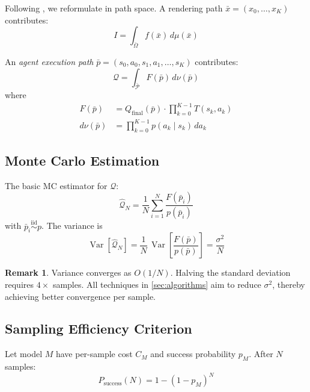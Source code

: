 \documentclass[11pt,twocolumn]{article}
\theoremstyle{definition}
\newtheorem{remark}[theorem]{Remark}
\newcommand{\Var}{\operatorname{Var}}
\newcommand{\Pspace}{\bar{\mathcal{P}}}
\begin{document}
Following \citet{veach1997robust}, we reformulate in path space.
A rendering path $\bar{x} = (x_0, \ldots, x_K)$ contributes:
\begin{equation}\label{eq:veach-path}
  I = \int_{\bar\Omega} f(\bar{x})\,d\mu(\bar{x})
\end{equation}

An \emph{agent execution path}
$\bar{p} = (s_0, a_0, s_1, a_1, \ldots, s_K)$ contributes:
\begin{equation}\label{eq:agent-path}
  \mathcal{Q} = \int_{\Pspace} F(\bar{p})\,d\nu(\bar{p})
\end{equation}
where
\begin{align}
  F(\bar{p}) &= Q_{\text{final}}(\bar{p}) \cdot \prod_{k=0}^{K-1} T(s_k, a_k) \label{eq:path-throughput} \\
  d\nu(\bar{p}) &= \prod_{k=0}^{K-1} p(a_k \mid s_k)\,da_k \label{eq:path-measure}
\end{align}

\subsection{Monte Carlo Estimation}\label{sec:mc-basics}

The basic MC estimator for $\mathcal{Q}$:
\begin{equation}\label{eq:mc-estimator}
  \hat{\mathcal{Q}}_N = \frac{1}{N}\sum_{i=1}^{N} \frac{F(\bar{p}_i)}{p(\bar{p}_i)}
\end{equation}
with $\bar{p}_i \overset{\text{iid}}{\sim} p$.
The variance is
\begin{equation}\label{eq:mc-variance}
  \Var[\hat{\mathcal{Q}}_N]
    = \frac{1}{N}\,\Var\!\left[\frac{F(\bar{p})}{p(\bar{p})}\right]
    = \frac{\sigma^2}{N}
\end{equation}

\begin{remark}
Variance converges as $O(1/N)$.
Halving the standard deviation requires $4\times$ samples.
All techniques in \cref{sec:algorithms} aim to reduce $\sigma^2$,
thereby achieving better convergence per sample.
\end{remark}

\subsection{Sampling Efficiency Criterion}\label{sec:efficiency}

Let model $M$ have per-sample cost $C_M$ and success probability $p_M$.
After $N$ samples:
\begin{equation}\label{eq:success-prob}
  P_{\text{success}}(N) = 1 - (1-p_M)^N
\end{equation}
\end{document}
